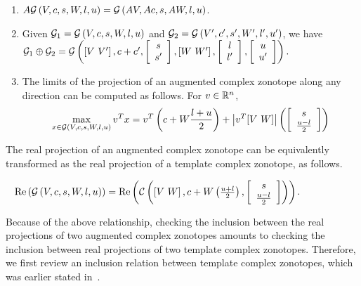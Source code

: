 \begin{enumerate}
\item $A\mathcal{G}\left(V,c,s,W,l,u\right) = \mathcal{G}\left(AV,Ac,s,AW,l,u\right)$.
\item Given $\mathcal{G}_1=\mathcal{G}\left(V,c,s,W,l,u\right)$ and $\mathcal{G}_2=\mathcal{G}\left(V^\prime,c^\prime,s^\prime,W^\prime,l^\prime,u^\prime\right)$, we have $\mathcal{G}_1 \oplus \mathcal{G}_2= \mathcal{G}\left(\left[V~V^\prime\right],c+c^\prime,\left[\begin{array}{c}{s}\\{s^\prime} \end{array}\right],\left[W~W^\prime\right],\left[\begin{array}{c}{l}\\{l^\prime} \end{array}\right],\left[\begin{array}{c}{u}\\{u^\prime} \end{array}\right]\right).$

%
\item The limits of the projection of an augmented complex zonotope along
any direction can be computed as follows. For $v\in\mathbb{R}^n$,
\begin{equation}\label{lem:polylimits-acz}
\max_{x\in\mathcal{G}\left(V,c,s,W,l,u\right)}v^Tx = v^T\left(c+W\frac{l+u}{2}\right)+\left|v^T[V~W]\right|\left(\left[\begin{array}{c}{s}\\{\frac{u-l}{2}} \end{array}\right]\right)
\end{equation}
\end{enumerate}
%


The real projection of an augmented complex zonotope can be
equivalently transformed as the real projection of a template complex
zonotope, as follows.
%
\begin{lemma}~\label{lem:conversion}
$\operatorname{\operatorname{Re}}\left(\mathcal{G}\left(V,c,s,W,l,u\right)\right) = \operatorname{\operatorname{Re}}\left(\mathcal{C}\left(\left[V~W\right],c+W\left(\frac{u+l}{2}\right),\left[\begin{array}{c}{s}\\{\frac{u-l}{2}} \end{array}\right]\right)\right)$.
\end{lemma}
%
Because of the above relationship, checking the inclusion between the
real projections of two augmented complex zonotopes amounts to
checking the inclusion between real projections of two template
complex zonotopes.  Therefore, we first review an inclusion relation
between template complex zonotopes, which was earlier stated
in~\cite{tcz2017}.

